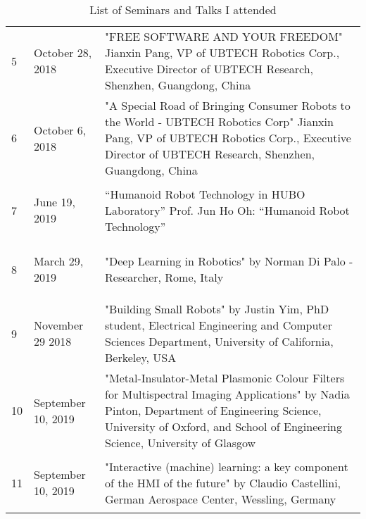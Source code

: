 \begin{table}[ht]
{\begin{tabular}{p{1cm} p{2.5cm} p{13cm}}
       \rowcolor{lightgray} 5 & \begin{center}
            October 28, 2018
        \end{center} & "FREE SOFTWARE AND YOUR FREEDOM" Jianxin Pang, VP of UBTECH Robotics Corp., Executive Director of UBTECH Research, Shenzhen, Guangdong, China\\
        
       6 &  \begin{center}
            October 6, 2018
        \end{center} & "A Special Road of Bringing Consumer Robots to the World - UBTECH Robotics Corp" Jianxin Pang, VP of UBTECH Robotics Corp., Executive Director of UBTECH Research, Shenzhen, Guangdong, China\\
        
        
        \rowcolor{lightgray} 7 & \begin{center}
           June 19, 2019
       \end{center} &“Humanoid Robot Technology in HUBO Laboratory” Prof. Jun Ho Oh: “Humanoid Robot Technology”\\
        
        8 & \begin{center}
            March 29, 2019
        \end{center}& "Deep Learning in Robotics" by Norman Di Palo - Researcher, Rome, Italy \\
        
        \rowcolor{lightgray} 9 & \begin{center}
            November 29 2018
        \end{center} & "Building Small Robots" by Justin Yim, PhD student, Electrical Engineering and Computer Sciences Department, University of California, Berkeley, USA \\
        10 & \begin{center}
            September 10, 2019 
        \end{center} & "Metal-Insulator-Metal Plasmonic Colour Filters for Multispectral Imaging Applications" by Nadia Pinton, Department of Engineering Science, University of Oxford, and School of Engineering Science, University of Glasgow\\
        
        \rowcolor{lightgray} 11 & \begin{center}
              September 10, 2019
        \end{center} & "Interactive (machine) learning: a key component of the HMI of the future" by Claudio Castellini, German Aerospace Center, Wessling, Germany\\
 \end{tabular}}
 \caption{List of Seminars and Talks I attended}
 \label{table:Seminar}
\end{table}

